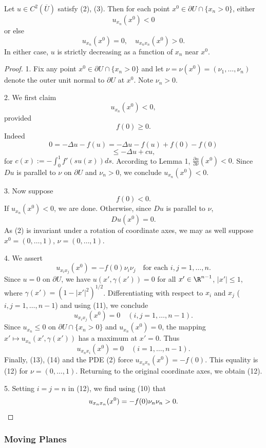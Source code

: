 \begin{lemma}
\label{lem:boundary-estimates-radial-symmetry}
Let $u \in C^2(\overline{U})$ satisfy (2), (3). Then for each point $x^0 \in \partial U \cap \{x_n > 0\}$, either
\[
u_{x_n}(x^0) < 0
\tag{7}
\]
or else
\[
u_{x_n}(x^0) = 0, \quad u_{x_nx_n}(x^0) > 0.
\tag{8}
\]
In either case, $u$ is strictly decreasing as a function of $x_n$ near $x^0$.
\end{lemma}
\begin{proof}
1. Fix any point $x^0 \in \partial U \cap \{x_n > 0\}$ and let $\nu = \nu(x^0) = (\nu_1, \ldots, \nu_n)$ denote the outer unit normal to $\partial U$ at $x^0$. Note $\nu_n > 0$.

2. We first claim
\[
u_{x_n}(x^0) < 0,
\]
provided
\[
f(0) \geq 0.
\tag{9}
\]
Indeed
\[
0 = -\Delta u - f(u) = -\Delta u - f(u) + f(0) - f(0)
\]
\[
\leq -\Delta u + cu,
\]
for $c(x) := -\int_0^1 f'(su(x)) ds$. According to Lemma 1, $\frac{\partial u}{\partial \nu}(x^0) < 0$. Since $Du$ is parallel to $\nu$ on $\partial U$ and $\nu_n > 0$, we conclude $u_{x_n}(x^0) < 0$.

3. Now suppose
\[
f(0) < 0.
\tag{10}
\]
If $u_{x_n}(x^0) < 0$, we are done. Otherwise, since $Du$ is parallel to $\nu$,
\[
Du(x^0) = 0.
\tag{11}
\]
As (2) is invariant under a rotation of coordinate axes, we may as well suppose $x^0 = (0,\ldots,1)$, $\nu = (0,\ldots,1)$.

4. We assert
\[
u_{x_ix_j}(x^0) = -f(0)\nu_i \nu_j \quad \text{for each } i,j = 1,\ldots,n.
\tag{12}
\]
Since $u = 0$ on $\partial U$, we have $u(x', \gamma(x')) = 0$ for all $x' \in \R^{n-1}$, $|x'| \le 1$, where $\gamma(x') = (1-|x'|^2)^{1/2}$. Differentiating with respect to $x_i$ and $x_j$ ($i,j = 1,\ldots,n-1$) and using (11), we conclude
\[
u_{x_ix_j}(x^0) = 0 \quad (i,j = 1,\ldots,n-1).
\tag{13}
\]
Since $u_{x_n} \le 0$ on $\partial U \cap \{x_n > 0\}$ and $u_{x_n}(x^0) = 0$, the mapping $x' \mapsto u_{x_n}(x', \gamma(x'))$ has a maximum at $x' = 0$. Thus
\[
u_{x_nx_i}(x^0) = 0 \quad (i = 1,\ldots,n-1).
\tag{14}
\]
Finally, (13), (14) and the PDE (2) force $u_{x_nx_n}(x^0) = -f(0)$. This equality is (12) for $\nu = (0,\ldots,1)$. Returning to the original coordinate axes, we obtain (12).

5. Setting $i = j = n$ in (12), we find using (10) that
\[
u_{x_nx_n}(x^0) = -f(0)\nu_n \nu_n > 0. \qedhere
\]
\end{proof}

\subsubsection{Moving Planes}
\label{sec:moving-planes}

